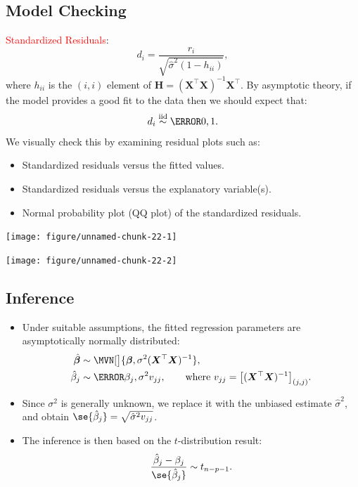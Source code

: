 \documentclass{article}\usepackage[]{graphicx}\usepackage[svgnames]{xcolor}
\newenvironment{knitrout}{}{} %
\newcommand*\circled[1]{\tikz[baseline=(char.base)]{\node[shape=circle,draw,inner sep=2pt] (char) {#1};}}
\newcommand{\iid}{\overset{\text{iid}}{\sim}}%
\providecommand{\Vector}[1]{\bm{#1}}%
\providecommand{\Matrix}[1]{\bm{#1}}
\begin{document}
\subsection*{\circled{3} Model Checking}
\textcolor{Red}{Standardized Residuals}:
\[ d_i=\frac{r_i}{\sqrt{\hat{\sigma}^2(1-h_{ii})}},  \]
where $ h_{ii} $ is the $ (i,i) $ element of $ \Matrix{H}=(\Matrix{X}^\top\Matrix{X})^{-1}\Matrix{X}^\top $.
By asymptotic theory, if the model provides a good fit to the data then we
should expect that:
\[ d_i\iid \N{0,1}. \]
We visually check this by examining residual plots such as:
\begin{itemize}
      \item Standardized residuals versus the fitted values.
      \item Standardized residuals versus the explanatory variable(s).
      \item Normal probability plot (QQ plot) of the standardized residuals.
\end{itemize}
\begin{knitrout}
\color{fgcolor}

{\centering \texttt{[image: figure/unnamed-chunk-22-1]} 

}




{\centering \texttt{[image: figure/unnamed-chunk-22-2]} 

}


\end{knitrout}

\subsection*{\circled{4} Inference}
\begin{itemize}
      \item Under suitable assumptions, the fitted regression parameters are asymptotically
            normally distributed:
            \begin{align*}
                  \hat{\Vector{\beta}} & \sim \MVN[\big]{\Vector{\beta},\sigma^2(\Matrix{X}^\top \Matrix{X})^{-1}},                                        \\
                  \hat{\beta}_j        & \sim \N{\beta_j,\sigma^2v_{jj}},\qquad\text{where $v_{jj}=\bigl[(\Matrix{X}^\top\Matrix{X})^{-1}\bigr]_{(j,j)}$}.
            \end{align*}
      \item Since $ \sigma^2 $ is generally unknown, we replace it with the unbiased estimate $ \hat{\sigma}^2 $, and obtain $ \se{\hat{\beta}_j}=\sqrt{\hat{\sigma}^2v_{jj}} $.
      \item The inference is then based on the $t$-distribution result:
            \[ \frac{\hat{\beta}_j-\beta_j}{\se{\hat{\beta}_j}}\sim t_{n-p-1}.  \]
\end{itemize}
\end{document}
